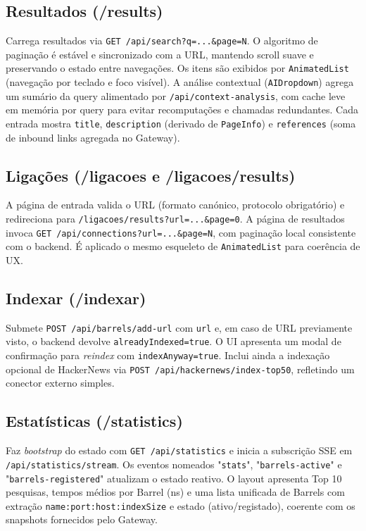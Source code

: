 \documentclass[12pt,a4paper]{article}
\begin{document}
\subsection{Resultados (/results)}
Carrega resultados via \texttt{GET /api/search?q=...\&page=N}. O algoritmo de paginação é estável e sincronizado com a URL, mantendo scroll suave e preservando o estado entre navegações. Os itens são exibidos por \texttt{AnimatedList} (navegação por teclado e foco visível). A análise contextual (\texttt{AIDropdown}) agrega um sumário da query alimentado por \texttt{/api/context-analysis}, com cache leve em memória por query para evitar recomputações e chamadas redundantes. Cada entrada mostra \texttt{title}, \texttt{description} (derivado de \texttt{PageInfo}) e \texttt{references} (soma de inbound links agregada no Gateway).

\subsection{Ligações (/ligacoes e /ligacoes/results)}
A página de entrada valida o URL (formato canónico, protocolo obrigatório) e redireciona para \texttt{/ligacoes/results?url=...\&page=0}. A página de resultados invoca \texttt{GET /api/connections?url=...\&page=N}, com paginação local consistente com o backend. É aplicado o mesmo esqueleto de \texttt{AnimatedList} para coerência de UX.

\subsection{Indexar (/indexar)}
Submete \texttt{POST /api/barrels/add-url} com \texttt{url} e, em caso de URL previamente visto, o backend devolve \texttt{alreadyIndexed=true}. O UI apresenta um modal de confirmação para \textit{reindex} com \texttt{indexAnyway=true}. Inclui ainda a indexação opcional de HackerNews via \texttt{POST /api/hackernews/index-top50}, refletindo um conector externo simples.

\subsection{Estatísticas (/statistics)}
Faz \textit{bootstrap} do estado com \texttt{GET /api/statistics} e inicia a subscrição SSE em \texttt{/api/statistics/stream}. Os eventos nomeados "\texttt{stats}", "\texttt{barrels-active}" e "\texttt{barrels-registered}" atualizam o estado reativo. O layout apresenta Top 10 pesquisas, tempos médios por Barrel (ns) e uma lista unificada de Barrels com extração \texttt{name:port:host:indexSize} e estado (ativo/registado), coerente com os snapshots fornecidos pelo Gateway.
\end{document}
